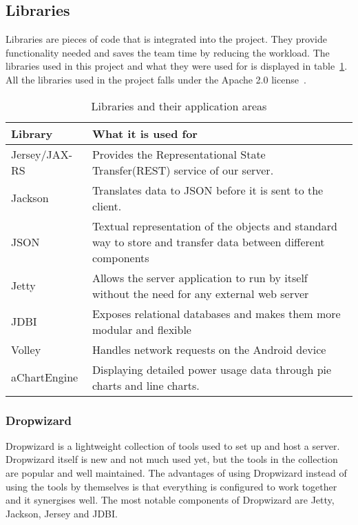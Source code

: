 \subsection{Libraries}
\label{sec:libraries}
Libraries are pieces of code that is integrated into the project. They provide functionality needed and saves the team time by reducing the workload. The libraries used in this project and what they were used for is displayed in table~\ref{tab:libs}.
 All the libraries used in the project falls under the Apache 2.0 license~\cite{Apache}.

\begin{table}[H]
\begin{tabular}{|l|p{12.9cm}|}
\hline
\textbf{Library }& \textbf{What it is used for}\\\hline
Jersey/JAX-RS & Provides the Representational State Transfer(REST) service of our server.\\\hline
Jackson&Translates data to JSON before it is sent to the client.\\\hline
JSON&Textual representation of the objects and standard way to store and transfer data between different components\\\hline
Jetty&Allows the server application to run by itself without the need for any external web server\\\hline
JDBI&Exposes relational databases and makes them more modular and flexible\\\hline
Volley & Handles network requests on the Android device\\\hline
aChartEngine& Displaying detailed power usage data through  pie charts and line charts.\\\hline
\end{tabular}
\caption{Libraries and their application areas}
\label{tab:libs}
\end{table}

\subsubsection{Dropwizard}
Dropwizard is a lightweight collection of tools used to set up and host a server. Dropwizard itself is new and not much used yet, but the tools in the collection are popular and well maintained. 
The advantages of using Dropwizard instead of using the tools by themselves is that everything is configured to work together and it synergises well. The most notable components of Dropwizard are Jetty, Jackson, Jersey and JDBI.



